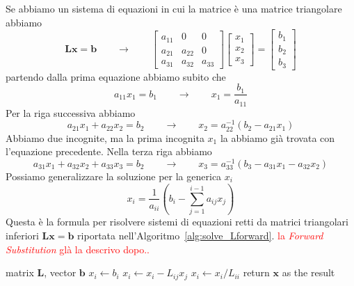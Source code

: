 \documentclass[10pt]{article}
\begin{document}
Se abbiamo un sistema di equazioni in cui la matrice è una matrice triangolare abbiamo
$$ \mathbf{L} \mathbf{x} = \mathbf{b}
\qquad \rightarrow \qquad
\begin{bmatrix}
a_{11} & 0 & 0 \\
a_{21} & a_{22} & 0 \\
a_{31} & a_{32} & a_{33}
\end{bmatrix}
\begin{bmatrix}
x_1 \\ x_2 \\ x_3
\end{bmatrix}
=
\begin{bmatrix}
b_1 	\\ b_2 \\ b_3
\end{bmatrix}
$$
partendo dalla prima equazione abbiamo subito che
$$ a_{11} x_1 = b_1 \qquad \rightarrow \qquad x_1 = \frac{b_1}{a_{11}} $$
Per la riga successiva abbiamo
$$ a_{21}x_1 + a_{22}x_2 = b_2 \qquad \rightarrow \qquad x_2 = a_{22}^{-1} (b_2 - a_{21}x_1) $$
Abbiamo due incognite, ma la prima incognita $x_1$ la abbiamo già trovata con l'equazione precedente.
Nella terza riga abbiamo
$$ a_{31}x_1 + a_{32}x_2 + a_{33}x_3 = b_2 \qquad \rightarrow \qquad x_3 = a_{33}^{-1} (b_3 - a_{31}x_1 - a_{32}x_2) $$
Possiamo generalizzare la soluzione per la generica $x_i$
\begin{equation}
x_i = \frac{1}{a_{ii}} \left( b_i - \sum_{j=1}^{i-1} a_{ij} x_j \right)
\end{equation}
Questa è la formula per risolvere sistemi di equazioni retti da matrici triangolari inferiori $\mathbf{Lx}=\mathbf{b}$ riportata nell'Algoritmo~\ref{alg:solve_Lforward}.
\textcolor{red}{la \textit{Forward Substitution} glà la descrivo dopo..}

\begin{algorithm}
\caption{Solve $\mathbf{Lx}=\mathbf{b}$ (forward)}\label{alg:solve_Lforward}
\begin{algorithmic}[1]
\Require matrix $\mathbf{L}$, vector $\mathbf{b}$ 
 
	\State $x_i \gets {b_i}$
	 
		\State $x_i \gets x_i - L_{ij}x_j$
	\EndFor
	\State $x_i \gets x_i / L_{ii}$ 
\EndFor
\State return $\mathbf{x}$ as the result
\end{algorithmic}
\end{algorithm}
\end{document}
